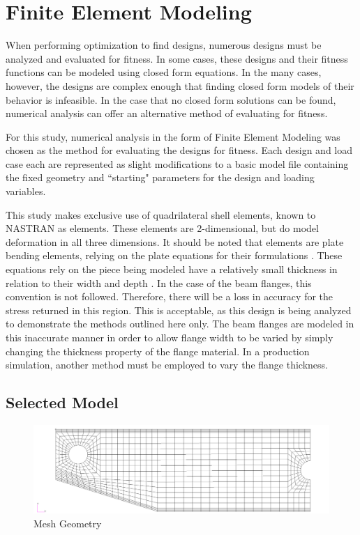 \section{Finite Element Modeling}

When performing optimization to find designs, numerous designs must be analyzed and evaluated for fitness. In some cases, these designs and their fitness functions can be modeled using closed form equations. In the many cases, however, the designs are complex enough that finding closed form models of their behavior is infeasible. In the case that no closed form solutions can be found, numerical analysis can offer an alternative method of evaluating for fitness. 

For this study, numerical analysis in the form of Finite Element Modeling was chosen as the method for evaluating the designs for fitness. Each design and load case each are represented as slight modifications to a basic model file containing the fixed geometry and ``starting" parameters for the design and loading variables.  

This study makes exclusive use of quadrilateral shell elements, known to NASTRAN as  elements. These elements are 2-dimensional, but do model deformation in all three dimensions. It should be noted that  elements are plate bending elements, relying on the plate equations for their formulations . These equations rely on the piece being modeled have a relatively small thickness in relation to their width and depth \cite{reddy}. In the case of the beam flanges, this convention is not followed. Therefore, there will be a loss in accuracy for the stress returned in this region. This is acceptable, as this design is being analyzed to demonstrate the methods outlined here only. The beam flanges are modeled in this inaccurate manner in order to allow flange width to be varied by simply changing the thickness property of the flange material. In a production simulation, another method must be employed to vary the flange thickness.  

\subsection{Selected Model}
\label{sec:model}

\begin{figure}
\includegraphics[width=\textwidth]{img/mesh_geom.png}
\caption{Mesh Geometry}
\label{img:mesh_geom}
\end{figure}

